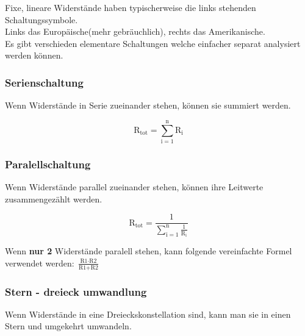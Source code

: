 Fixe, lineare Widerstände haben typischerweise die links stehenden Schaltungssymbole.\\
Links das Europäische(mehr gebräuchlich), rechts das Amerikanische.\\
Es gibt verschieden elementare Schaltungen welche einfacher separat analysiert werden können.\\

\subsubsection{Serienschaltung}

Wenn Widerstände in Serie zueinander stehen, können sie summiert werden.\\
\begin{center}
    
\end{center}
    
\[ \text{R}_\text{tot} = \sum_{\text{i}=1}^{\text{n}} \text{R}_\text{i}\]

\subsubsection{Paralellschaltung}

Wenn Widerstände parallel zueinander stehen, können ihre Leitwerte zusammengezählt werden.\\

\begin{center}
    
\end{center}

\[ \text{R}_\text{tot} = \frac{1}{\sum_{\text{i}=1}^{\text{n}} \frac{1}{\text{R}_\text{i}}} \]

Wenn \textbf{nur 2} Widerstände paralell stehen, kann folgende vereinfachte Formel verwendet werden: $\frac{\text{R1}\cdot\text{R2}}{\text{R1}+\text{R2}}$\\

\subsubsection{Stern - dreieck umwandlung}

Wenn Widerstände in eine Dreieckskonstellation sind, kann man sie in einen Stern und umgekehrt umwandeln.\\

